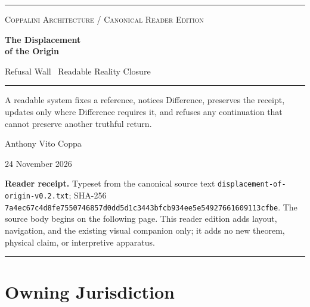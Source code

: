 \documentclass[11pt,letterpaper]{article}
\begin{document}
\begin{titlepage}
\thispagestyle{empty}
\vspace*{.55in}
{\color{deep}\rule{\textwidth}{1.4pt}}\par
\vspace{.34in}
{\small\textsc{Coppalini Architecture / Canonical Reader Edition}}\par
\vspace{.24in}
{\fontsize{34}{39}\selectfont\bfseries\color{ink}The Displacement\\[.04em]of the Origin\par}
\vspace{.22in}
{\Large\color{deep}Refusal Wall \textbar\ Readable Reality Closure\par}
\vspace{.38in}
{\color{rule}\rule{.82\textwidth}{.55pt}}\par
\vspace{.34in}
\begin{minipage}{.86\textwidth}
\large
A readable system fixes a reference, notices Difference, preserves the receipt,
updates only where Difference requires it, and refuses any continuation that
cannot preserve another truthful return.
\end{minipage}\par
\vfill
{\large Anthony Vito Coppa\par}
{\normalsize 24 November 2026\par}
\vspace{.35in}
\begin{minipage}{.88\textwidth}
\small\color{muted}
\textbf{Reader receipt.} Typeset from the canonical source text
\texttt{displacement-of-origin-v0.2.txt}; SHA-256
\texttt{7a4ec67c4d8fe7550746857d0dd5d1c3443bfcb934ee5e54927661609113cfbe}.
The source body begins on the following page. This reader edition adds layout,
navigation, and the existing visual companion only; it adds no new theorem,
physical claim, or interpretive apparatus.
\end{minipage}\par
\vspace{.22in}
{\color{deep}\rule{\textwidth}{1.4pt}}\par
\end{titlepage}

\clearpage
{}

\section*{Owning Jurisdiction}
\end{document}
